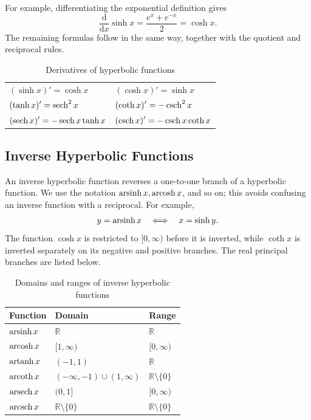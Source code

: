 For example, differentiating the exponential definition gives
\[
    \frac{\mathrm{d}}{\mathrm{d}x}\sinh x
    =\frac{e^x+e^{-x}}{2}=\cosh x.
\]
The remaining formulas follow in the same way, together with the quotient
and reciprocal rules.
\begin{table}[H]
    \centering
    \begin{tabular}{ll}
        \toprule
        \(\displaystyle (\sinh x)'=\cosh x\)
            & \(\displaystyle (\cosh x)'=\sinh x\) \\
        \(\displaystyle (\tanh x)'=\operatorname{sech}^2x\)
            & \(\displaystyle (\coth x)'=-\operatorname{csch}^2x\) \\
        \(\displaystyle (\operatorname{sech} x)'=-\operatorname{sech} x\tanh x\)
            & \(\displaystyle (\operatorname{csch} x)'=-\operatorname{csch} x\coth x\) \\
        \bottomrule
    \end{tabular}
    \caption{Derivatives of hyperbolic functions}
    \label{tab:hyperbolic-derivatives}
\end{table}

\subsection{Inverse Hyperbolic Functions}

An inverse hyperbolic function reverses a one-to-one branch of a
hyperbolic function.  We use the notation \(\operatorname{arsinh} x,\operatorname{arcosh} x\), and so
on; this avoids confusing an inverse function with a reciprocal.  For
example,
\[
    y=\operatorname{arsinh} x
    \quad\Longleftrightarrow\quad
    x=\sinh y.
\]
The function \(\cosh x\) is restricted to \([0,\infty)\) before it is
inverted, while \(\coth x\) is inverted separately on its negative and
positive branches.  The real principal branches are listed below.

\begin{table}[H]
    \centering
    \small
    \begin{tabular}{lll}
        \toprule
        Function & Domain & Range \\
        \midrule
        \(\operatorname{arsinh} x\) & \(\mathbb{R}\) & \(\mathbb{R}\) \\
        \(\operatorname{arcosh} x\) & \([1,\infty)\) & \([0,\infty)\) \\
        \(\operatorname{artanh} x\) & \((-1,1)\) & \(\mathbb{R}\) \\
        \(\operatorname{arcoth} x\) & \(( -\infty,-1)\cup(1,\infty)\)
            & \(\mathbb{R}\setminus\{0\}\) \\
        \(\operatorname{arsech} x\) & \((0,1]\) & \([0,\infty)\) \\
        \(\operatorname{arcsch} x\) & \(\mathbb{R}\setminus\{0\}\)
            & \(\mathbb{R}\setminus\{0\}\) \\
        \bottomrule
    \end{tabular}
    \caption{Domains and ranges of inverse hyperbolic functions}
    \label{tab:inverse-hyperbolic-domains-ranges}
\end{table}


